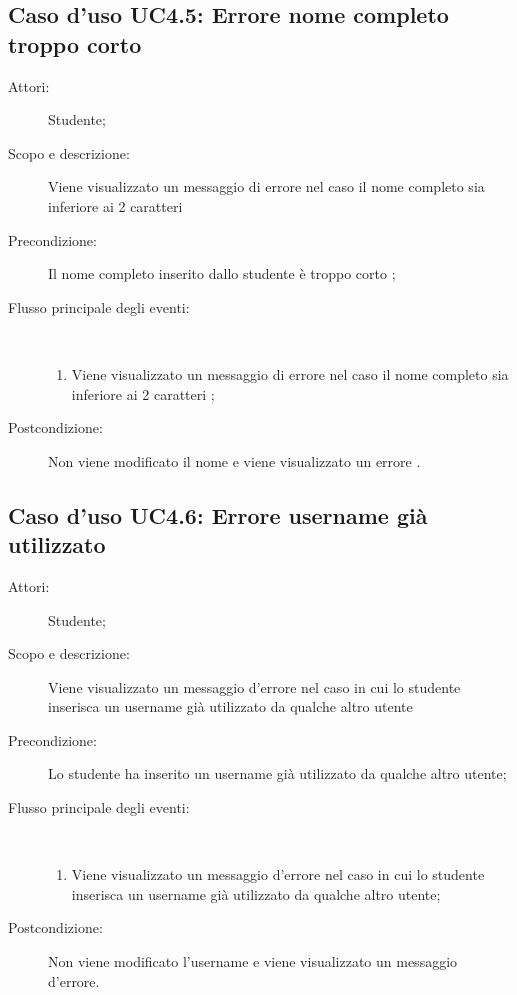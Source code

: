 \subsection{Caso d'uso UC4.5: Errore nome completo troppo corto}\begin{description}
\item[Attori:] Studente;
\item[Scopo e descrizione:] Viene visualizzato un messaggio di errore nel caso il nome completo sia inferiore ai 2 caratteri

      \item[Precondizione:] Il nome completo inserito dallo studente è troppo corto
;

        \item[Flusso principale degli eventi:] \ 
 \begin{enumerate}
          \item Viene visualizzato un messaggio di errore nel caso il nome completo sia inferiore ai 2 caratteri	;

      \end{enumerate}
    \item[Postcondizione:] Non viene modificato il nome e viene visualizzato un errore
.
  \end{description}
\hypertarget{UC4.6}{}
\subsection{Caso d'uso UC4.6: Errore username già utilizzato}\begin{description}
\item[Attori:] Studente;
\item[Scopo e descrizione:] Viene visualizzato un messaggio d'errore nel caso in cui lo studente inserisca un username già utilizzato da qualche altro utente
      \item[Precondizione:] Lo studente ha inserito un username già utilizzato da qualche altro utente;

        \item[Flusso principale degli eventi:] \ 
 \begin{enumerate}
          \item Viene visualizzato un messaggio d'errore nel caso in cui lo studente inserisca un username già utilizzato da qualche altro utente;

      \end{enumerate}
    \item[Postcondizione:] Non viene modificato l'username e viene visualizzato un messaggio d'errore.
  \end{description}
\hypertarget{UC4.7}{}
